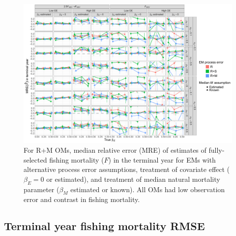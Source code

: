 \documentclass[
  12pt,
]{article}
\begin{document}
\begin{landscape}
\begin{figure}
\begin{center}
\includegraphics[height = \textheight]{terminal_year_F_bias_RMom}
\end{center}
\caption{For R+M OMs, median relative error (MRE) of estimates of fully-selected fishing mortality ($F$) in the terminal year for EMs with alternative process error assumptions, treatment of covariate effect ($\beta_E = 0$ or estimated), and treatment of median natural mortality parameter ($\beta_M$ estimated or known). All OMs had low observation error and contrast in fishing mortality.}\label{terminal_F_bias_RMom}
\end{figure}
\end{landscape}

\hypertarget{terminal-year-fishing-mortality-rmse}{%
\subsection*{Terminal year fishing mortality RMSE}\label{terminal-year-fishing-mortality-rmse}}
\end{document}
